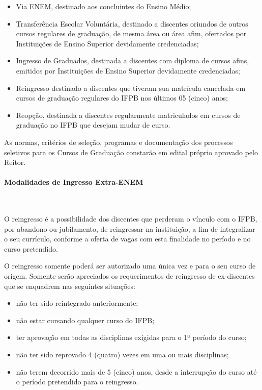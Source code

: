 \begin{itemize}
	\item Via ENEM, destinado aos concluintes do Ensino Médio;

	\item Transferência Escolar Voluntária, destinado a discentes oriundos de outros cursos regulares de graduação, de mesma área ou área afim, ofertados por Instituições de Ensino Superior devidamente credenciadas;

	\item Ingresso de Graduados, destinada a discentes com diploma de cursos afins, emitidos por Instituições de Ensino Superior devidamente credenciadas;

	\item Reingresso destinado a discentes que tiveram sua matrícula cancelada em cursos de graduação regulares do IFPB nos últimos 05 (cinco) anos;

	\item Reopção, destinada a discentes regularmente matriculados em cursos de graduação no IFPB que desejam mudar de curso.
\end{itemize}

	As normas, critérios de seleção, programas e documentação dos processos seletivos para os Cursos de Graduação constarão em edital próprio aprovado pelo Reitor.
	
\paragraph{Modalidades de Ingresso Extra-ENEM}\

	O reingresso é a possibilidade dos discentes que perderam o vínculo com o IFPB, por abandono ou jubilamento, de reingressar na instituição, a fim de integralizar o seu currículo, conforme a oferta de vagas com esta finalidade no período e no curso pretendido.

	O reingresso somente poderá ser autorizado uma única vez e para o seu curso de origem. Somente serão apreciados os requerimentos de reingresso de ex-discentes que se enquadrem nas seguintes situações:

\begin{itemize}
	\item não ter sido reintegrado anteriormente;

 	\item não estar cursando qualquer curso do IFPB;

 	\item ter aprovação em todas as disciplinas exigidas para o 1º período do curso;

 	\item não ter sido reprovado 4 (quatro) vezes em uma ou mais disciplinas;

	\item não terem decorrido mais de 5 (cinco) anos, desde a interrupção do curso até o período pretendido para o reingresso.
\end{itemize}

